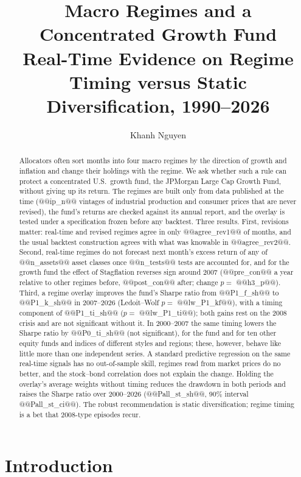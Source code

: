 \documentclass[11pt,a4paper]{article}
\title{\textbf{Macro Regimes and a Concentrated Growth Fund}\\[0.4em]
\large Real-Time Evidence on Regime Timing versus Static Diversification, 1990--2026}
\author{Khanh Nguyen}
\date{}
\begin{document}
\maketitle

\begin{abstract}
\noindent Allocators often sort months into four macro regimes by the direction of growth and inflation and
change their holdings with the regime. We ask whether such a rule can protect a concentrated U.S.\ growth
fund, the JPMorgan Large Cap Growth Fund, without giving up its return. The regimes are built only from data
published at the time (@@ip_n@@ vintages of industrial production and consumer prices that are never
revised), the fund's returns are checked against its annual report, and the overlay is tested under a
specification frozen before any backtest. Three results. First, revisions matter: real-time and revised
regimes agree in only @@agree_rev1@@ of months, and the usual backtest construction agrees with what was
knowable in @@agree_rev2@@. Second, real-time regimes do not forecast next month's excess return of any of
@@n_assets@@ asset classes once @@n_tests@@ tests are accounted for, and for the growth fund the effect of
Stagflation reverses sign around 2007 (@@pre_con@@ a year relative to other regimes before, @@post_con@@ after; change $p=$ @@h3_p@@).
Third, a regime overlay improves the fund's Sharpe ratio from @@P1_f_sh@@ to @@P1_k_sh@@ in 2007--2026
(Ledoit--Wolf $p=$ @@lw_P1_kf@@), with a timing component of @@P1_ti_sh@@ ($p=$ @@lw_P1_ti@@); both gains rest on the
2008 crisis and are not significant without it. In 2000--2007 the same timing lowers the Sharpe ratio by
@@P0_ti_sh@@ (not significant), for the fund and for ten other equity funds and indices of different styles and
regions; these, however, behave like little more than one independent series. A standard predictive regression on the same real-time signals has no out-of-sample skill, regimes read from market prices do no better, and the
stock--bond correlation does not explain the change. Holding the overlay's average weights without timing
reduces the drawdown in both periods and raises the Sharpe ratio over 2000--2026 (@@Pall_st_sh@@, 90\% interval
@@Pall_st_ci@@). The robust recommendation is static diversification; regime timing is a bet that 2008-type episodes recur.
\end{abstract}

\section{Introduction}
\label{sec:intro}
\end{document}
